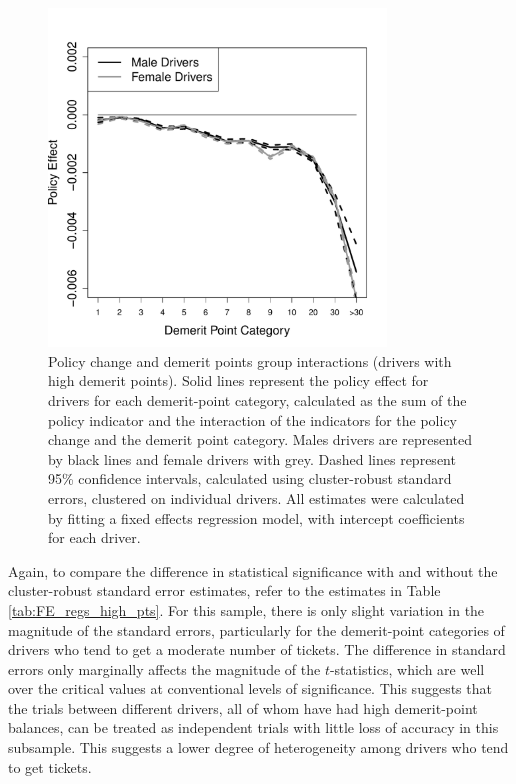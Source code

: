 \documentclass[12pt]{paper}
\begin{document}
\begin{figure}
\centering
\includegraphics[width=0.8\textwidth]{../Figures/FFX_reg_policy_points_grp_high_pts.pdf}
\caption{
Policy change and demerit points group interactions (drivers with high demerit points).
Solid lines represent the policy effect for drivers for each demerit-point category, 
calculated as the sum of the policy indicator and the interaction of the  indicators for the policy change 
and the demerit point category.  
Males drivers are represented by black lines and female drivers with grey. 
Dashed lines represent 95\% confidence intervals, 
calculated using cluster-robust standard errors, clustered on individual drivers. 
All estimates were calculated by fitting a fixed effects regression model, 
with intercept coefficients for each driver. 
}\label{fig:FE_regs_high_pts}
\end{figure}









Again, to compare the difference in statistical significance with and without 
the cluster-robust standard error estimates, 
refer to the estimates in Table \ref{tab:FE_regs_high_pts}. 
For this sample, there is only slight variation in the magnitude of the standard errors, 
particularly for the demerit-point categories of drivers who tend to get a moderate number of tickets. 
The difference in standard errors only marginally affects the magnitude of the $t$-statistics, 
which are well over the critical values at conventional levels of significance. 
This suggests that the trials between different drivers, all of whom have had high demerit-point balances, 
can be treated as independent trials with little loss of accuracy in this subsample. 
This suggests a lower degree of heterogeneity among drivers who tend to get tickets. 
\end{document}

